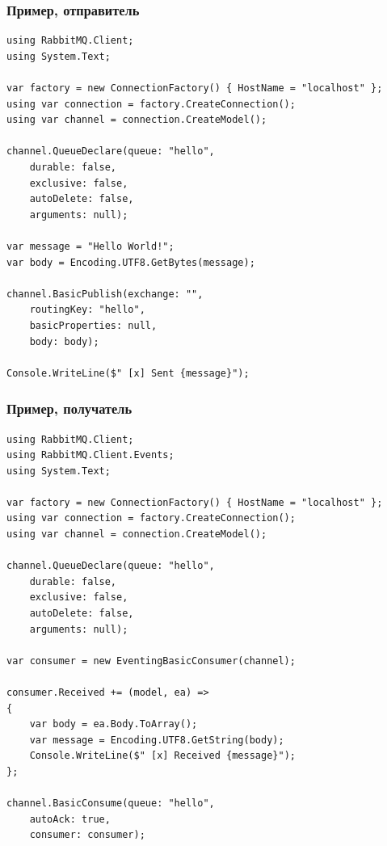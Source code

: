 \documentclass[xetex,mathserif,serif]{beamer}
\begin{document}
    \begin{frame}[fragile]
        \frametitle{Пример, отправитель}
        \begin{ssmall}
            \begin{verbatim}
using RabbitMQ.Client;
using System.Text;

var factory = new ConnectionFactory() { HostName = "localhost" };
using var connection = factory.CreateConnection();
using var channel = connection.CreateModel();

channel.QueueDeclare(queue: "hello",
    durable: false,
    exclusive: false,
    autoDelete: false,
    arguments: null);

var message = "Hello World!";
var body = Encoding.UTF8.GetBytes(message);

channel.BasicPublish(exchange: "",
    routingKey: "hello",
    basicProperties: null,
    body: body);

Console.WriteLine($" [x] Sent {message}");
            \end{verbatim}
        \end{ssmall}
    \end{frame}

    \begin{frame}[fragile]
        \frametitle{Пример, получатель}
        \begin{ssmall}
            \begin{verbatim}
using RabbitMQ.Client;
using RabbitMQ.Client.Events;
using System.Text;

var factory = new ConnectionFactory() { HostName = "localhost" };
using var connection = factory.CreateConnection();
using var channel = connection.CreateModel();

channel.QueueDeclare(queue: "hello",
    durable: false,
    exclusive: false,
    autoDelete: false,
    arguments: null);

var consumer = new EventingBasicConsumer(channel);

consumer.Received += (model, ea) =>
{
    var body = ea.Body.ToArray();
    var message = Encoding.UTF8.GetString(body);
    Console.WriteLine($" [x] Received {message}");
};

channel.BasicConsume(queue: "hello",
    autoAck: true,
    consumer: consumer);
            \end{verbatim}
        \end{ssmall}
    \end{frame}
\end{document}
